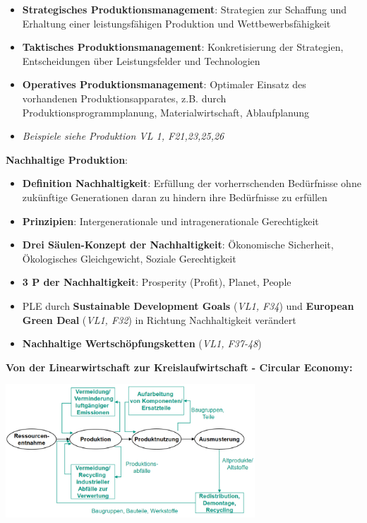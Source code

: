 \begin{itemize}
	\item \textbf{Strategisches Produktionsmanagement}: Strategien zur Schaffung und Erhaltung einer leistungsfähigen Produktion und Wettbewerbsfähigkeit
	\item \textbf{Taktisches Produktionsmanagement}: Konkretisierung der Strategien, Entscheidungen über Leistungsfelder und Technologien
	\item \textbf{Operatives Produktionsmanagement}: Optimaler Einsatz des vorhandenen Produktionsapparates, z.B. durch Produktionsprogrammplanung, Materialwirtschaft, Ablaufplanung
	\item \textit{Beispiele siehe Produktion VL 1, F21,23,25,26}
\end{itemize}
\bigskip
\textbf{Nachhaltige Produktion}:
\begin{itemize}
	\item \textbf{Definition Nachhaltigkeit}: Erfüllung der vorherrschenden Bedürfnisse ohne zukünftige Generationen daran zu hindern ihre Bedürfnisse zu erfüllen
	\item \textbf{Prinzipien}: Intergenerationale und intragenerationale Gerechtigkeit
	\item \textbf{Drei Säulen-Konzept der Nachhaltigkeit}: Ökonomische Sicherheit, Ökologisches Gleichgewicht, Soziale Gerechtigkeit
	\item \textbf{3 P der Nachhaltigkeit}: Prosperity (Profit), Planet, People
	\item PLE durch \textbf{Sustainable Development Goals} (\textit{VL1, F34}) und \textbf{European Green Deal} (\textit{VL1, F32}) in Richtung Nachhaltigkeit verändert
	\item \textbf{Nachhaltige Wertschöpfungsketten} (\textit{VL1, F37-48})
\end{itemize}
\pagebreak
\textbf{Von der Linearwirtschaft zur Kreislaufwirtschaft - Circular Economy:}
\begin{center}
	\includegraphics[width=0.7\textwidth]{images/circular-economy.png}
\end{center}




